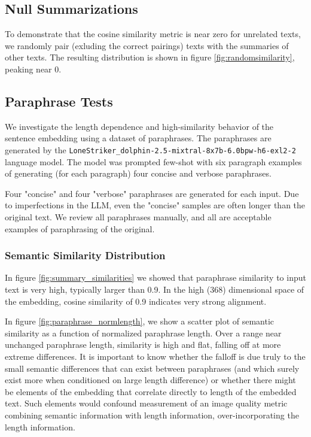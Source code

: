 \documentclass{article}
\begin{document}
{\subsection{Null Summarizations}

To demonstrate that the cosine similarity metric is near zero for unrelated texts, we randomly pair (exluding the correct pairings) texts with the summaries of other texts.  
The resulting distribution is shown in figure \ref{fig:randomsimilarity}, peaking near 0.

\subsection{Paraphrase Tests}

We investigate the length dependence and high-similarity behavior of the sentence embedding using a dataset of paraphrases.  
The paraphrases are generated by the \texttt{LoneStriker\_dolphin-2.5-mixtral-8x7b-6.0bpw-h6-exl2-2} language model.  
The model was prompted few-shot with six paragraph examples of generating (for each paragraph) four concise and verbose paraphrases.

Four "concise" and four "verbose" paraphrases are generated for each input. 
Due to imperfections in the LLM, even the "concise" samples are often longer than the original text.
We review all paraphrases manually, and all are acceptable examples of paraphrasing of the original.

\subsubsection{Semantic Similarity Distribution}

In figure \ref{fig:summary_similarities}
we showed that paraphrase similarity to input text is very high, typically larger than 0.9.  
In the high (368) dimensional space of the embedding, cosine similarity of 0.9 indicates very strong alignment.  

In figure \ref{fig:paraphrase_normlength}, 
we show a scatter plot of semantic similarity as a function of normalized paraphrase length.  Over a range near unchanged paraphrase length, similarity is high and flat, falling off at more extreme differences.
It is important to know whether the falloff is due truly to the small semantic differences that can exist between paraphrases (and which surely exist more when conditioned on large length difference) or whether there might be elements of the embedding that correlate directly to length of the embedded text. 
Such elements would confound measurement of an image quality metric combining semantic information with length information, over-incorporating the length information.

}
\end{document}
